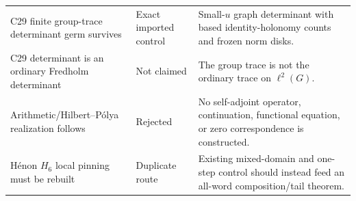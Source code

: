\begin{longtable}{@{}
>{\raggedright\arraybackslash}p{}
>{\raggedright\arraybackslash}p{}
>{\raggedright\arraybackslash}p{}@{}}
C29 finite group-trace determinant germ survives & Exact imported control &
Small-$u$ graph determinant with based identity-holonomy counts and frozen
norm disks. \\
C29 determinant is an ordinary Fredholm determinant & Not claimed & The group
trace is not the ordinary trace on $\ell^2(G)$. \\
Arithmetic/Hilbert--P\'olya realization follows & Rejected & No self-adjoint
operator, continuation, functional equation, or zero correspondence is
constructed. \\
H\'enon $H_6$ local pinning must be rebuilt & Duplicate route & Existing
mixed-domain and one-step control should instead feed an all-word
composition/tail theorem. \\
\bottomrule
\end{longtable}

